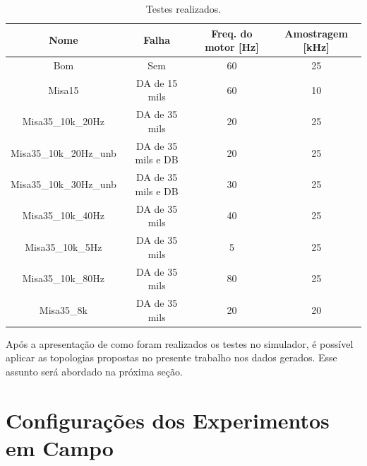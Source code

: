 \begin{table}[H]
    \caption{Testes realizados.}
    \label{tab:simulador}
    \centering%
    \begin{minipage}{\textwidth}
      \begin{tabular*}{\textwidth}{cccc}
        \hline
        {Nome}                   & Falha                     & Freq. do motor [Hz] & Amostragem [kHz]\\ \hline
        \hline
        Bom                      &  Sem                      &      60             &    25  \\ 
        Misa15                   &  DA de 15 mils            &      60             &    10  \\
        Misa35\_10k\_20Hz        &  DA de 35 mils            &      20             &    25  \\
        Misa35\_10k\_20Hz\_unb   &  DA de 35 mils e DB       &      20             &    25  \\
        Misa35\_10k\_30Hz\_unb   &  DA de 35 mils e DB       &      30             &    25  \\
        Misa35\_10k\_40Hz        &  DA de 35 mils            &      40             &    25  \\
        Misa35\_10k\_5Hz         &  DA de 35 mils            &      5              &    25  \\
        Misa35\_10k\_80Hz        &  DA de 35 mils            &      80             &    25  \\
        Misa35\_8k               &  DA de 35 mils            &      20             &    20  \\ \hline
      \end{tabular*}
    \end{minipage}
\end{table}
  
Após a apresentação de como foram realizados os testes no simulador, é possível aplicar as topologias propostas no presente trabalho nos
dados gerados. Esse assunto será abordado na próxima seção.


% 

\section{Configurações dos Experimentos em Campo}

